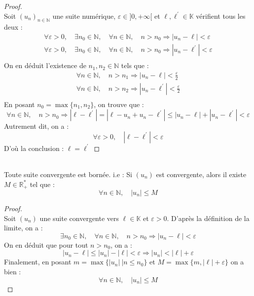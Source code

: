     \begin{proof}
        \ \\
        Soit \((u_n)_{n\in\mathbb{N}}\) une suite numérique, \(\varepsilon \in ]0, +\infty[ \) et \(\ell, \ell^{\prime} \in \mathbb{K}\) vérifient tous les deux :
        \[
            \begin{array}{l}
                \forall \varepsilon > 0, \quad \exists n_0 \in \mathbb{N}, \quad \forall n \in \mathbb{N}, \quad n > n_0 \Rightarrow |u_n - \ell| < \varepsilon\\
                \forall \varepsilon > 0, \quad \exists n_0 \in \mathbb{N}, \quad \forall n \in \mathbb{N}, \quad n > n_0 \Rightarrow |u_n - \ell^{\prime}| < \varepsilon\\
            \end{array}
        \]
        On en déduit l'existence de \(n_1, n_2 \in \mathbb{N}\) tels que :
        \[
            \begin{array}{l}
                \forall n \in \mathbb{N},\quad n > n_1 \Rightarrow |u_n - \ell| < \frac{\varepsilon}{2}\\
                \forall n \in \mathbb{N},\quad n > n_2 \Rightarrow |u_n - \ell^{\prime}| < \frac{\varepsilon}{2}\\
            \end{array}    
        \]
        En posant \(n_0 = \max{\{n_1, n_2\}}\), on trouve que :
        \[
            \forall n \in \mathbb{N},\quad n > n_0 \Rightarrow |\ell - \ell^{\prime}| = |\ell - u_n + u_n - \ell^{\prime}| \le |u_n - \ell| + |u_n - \ell^{\prime}| < \varepsilon
        \]
        Autrement dit, on a :
        \[
            \forall \varepsilon > 0, \quad |\ell - \ell^{\prime}| < \varepsilon 
        \]
        D'où la conclusion : \(\ell =  \ell^{\prime}\)
    \end{proof}

    \begin{theorem}
        \ \\
        Toute suite convergente est bornée. i.e : Si \((u_n)\) est convergente, alors il existe \(M \in \mathbb{R}^{*}_{+}\) tel que :
        \[\forall n \in \mathbb{N}, \quad |u_n| \le M\]
    \end{theorem}

    \begin{proof}
        \ \\
        Soit \((u_n)\) une suite convergente vers \(\ell \in  \mathbb{K}\) et \(\varepsilon > 0\). D'après la définition de la limite, on a :
        \[
            \exists n_0 \in \mathbb{N}, \quad \forall n \in \mathbb{N}, \quad n > n_0 \Rightarrow |u_n - \ell| < \varepsilon    
        \]
        On en déduit que pour tout \(n>n_0\), on a :
        \[
            |u_n - \ell| \le |u_n| - |\ell| < \varepsilon \Rightarrow |u_n| < |\ell| +\varepsilon     
        \]
        Finalement, en posant \(m = \max{\{|u_n|\ | n \le n_0\}}\) et \(M = \max{\{m, |\ell| + \varepsilon\}}\) on a bien :
        \[\forall n \in \mathbb{N}, \quad |u_n| \le M\]
    \end{proof}

